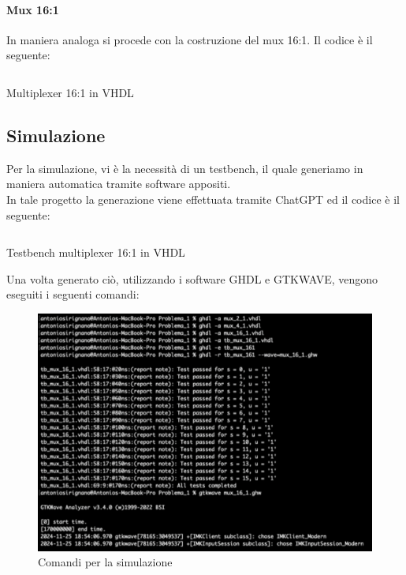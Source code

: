 \paragraph{Mux 16:1} In maniera analoga si procede con la costruzione del mux 16:1.
Il codice è il seguente:
\begin{code}
    \inputminted[frame=lines, framesep=2mm, baselinestretch=1.2, bgcolor=LightGray, fontsize=\footnotesize, linenos]{vhdl}{vhdl_files/mux_16_1.vhdl}
    \caption{Multiplexer 16:1 in VHDL}
    \label{lst:mux_16_1}
\end{code}

\subsection{Simulazione}
Per la simulazione, vi è la necessità di un testbench, il quale generiamo in maniera automatica tramite software appositi.\\
In tale progetto la generazione viene effettuata tramite ChatGPT ed il codice è il seguente:
\begin{code}
    \inputminted[frame=lines, framesep=2mm, baselinestretch=1.2, bgcolor=LightGray, fontsize=\footnotesize, linenos]{vhdl}{vhdl_files/tb_mux_16_1.vhdl}
    \caption{Testbench multiplexer 16:1 in VHDL}
    \label{lst:tb_mux_16_1}
\end{code}
 Una volta generato ciò, utilizzando i software GHDL e GTKWAVE, vengono eseguiti i seguenti comandi:
 \begin{figure}[H]
	\centering
	\includegraphics[width=1\textwidth]{img/commands_sim_16_1}
	\caption{Comandi per la simulazione}
	\label{comandi_sim_mux_16:1} 
\end{figure}
